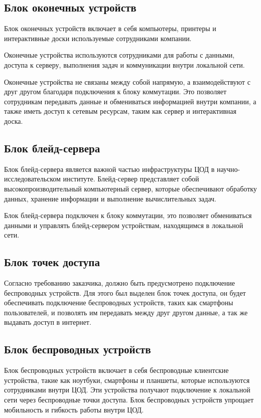 \subsection{Блок оконечных устройств}

Блок оконечных устройств включает в себя компьютеры, принтеры и интерактивные доски используемые сотрудниками компании.

Оконечные устройства используются сотрудниками для работы с данными, доступа к серверу, выполнения задач и коммуникации внутри локальной сети.

Оконечные устройства не связаны между собой напрямую, а взаимодействуют с друг другом благодаря подключения к блоку коммутации. Это позволяет сотрудникам передавать данные и обмениваться информацией внутри компании, а также иметь доступ к сетевым ресурсам, таким как сервер и интерактивная доска.

\subsection{Блок блейд-сервера}

Блок блейд-сервера является важной частью инфраструктуры ЦОД в научно-исследовательском институте. Блейд-сервер представляет собой высокопроизводительный компьютерный сервер, которые обеспечивают обработку данных, хранение информации и выполнение вычислительных задач. 

Блок блейд-сервера подключен к блоку коммутации, это позволяет обмениваться данными и управлять блейд-сервером устройствам, находящимся в локальной сети.

\subsection{Блок точек доступа}

Согласно требованию заказчика, должно быть предусмотрено подключение беспроводных устройств. Для этого был выделен блок точек доступа, он будет обеспечивать подключение беспроводных устройств, таких как смартфоны пользователей, и позволять им передавать между друг другом данные, а так же выдавать доступ в интернет.

\subsection{Блок беспроводных устройств}

Блок беспроводных устройств включает в себя беспроводные клиентские устройства, такие как ноутбуки, смартфоны и планшеты, которые используются сотрудниками внутри ЦОД. Эти устройства получают подключение к локальной сети через беспроводные точки доступа. Блок беспроводных устройств упрощает мобильность и гибкость работы внутри ЦОД.


